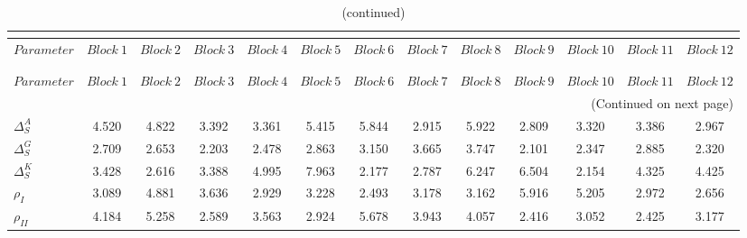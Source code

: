  
\begin{center}
\begin{longtable}{lcccccccccccc} 
\caption{MCMC Inefficiency factors per block}\\
 \label{Table:MCMC_inefficiency_factors}\\
\toprule 
$Parameter           $	 & 	 $     Block~1$	 & 	 $     Block~2$	 & 	 $     Block~3$	 & 	 $     Block~4$	 & 	 $     Block~5$	 & 	 $     Block~6$	 & 	 $     Block~7$	 & 	 $     Block~8$	 & 	 $     Block~9$	 & 	 $    Block~10$	 & 	 $    Block~11$	 & 	 $    Block~12$\\
\midrule \endfirsthead 
\caption{(continued)}\\
 \toprule \\ 
$Parameter           $	 & 	 $     Block~1$	 & 	 $     Block~2$	 & 	 $     Block~3$	 & 	 $     Block~4$	 & 	 $     Block~5$	 & 	 $     Block~6$	 & 	 $     Block~7$	 & 	 $     Block~8$	 & 	 $     Block~9$	 & 	 $    Block~10$	 & 	 $    Block~11$	 & 	 $    Block~12$\\
\midrule \endhead 
\midrule \multicolumn{13}{r}{(Continued on next page)} \\ \bottomrule \endfoot 
\bottomrule \endlastfoot 
$ {\Delta^{A}_{S}}   $	 & 	       4.520	 & 	       4.822	 & 	       3.392	 & 	       3.361	 & 	       5.415	 & 	       5.844	 & 	       2.915	 & 	       5.922	 & 	       2.809	 & 	       3.320	 & 	       3.386	 & 	       2.967 \\ 
$ {\Delta^{G}_{S}}   $	 & 	       2.709	 & 	       2.653	 & 	       2.203	 & 	       2.478	 & 	       2.863	 & 	       3.150	 & 	       3.665	 & 	       3.747	 & 	       2.101	 & 	       2.347	 & 	       2.885	 & 	       2.320 \\ 
$ {\Delta^{K}_{S}}   $	 & 	       3.428	 & 	       2.616	 & 	       3.388	 & 	       4.995	 & 	       7.963	 & 	       2.177	 & 	       2.787	 & 	       6.247	 & 	       6.504	 & 	       2.154	 & 	       4.325	 & 	       4.425 \\ 
$ {\rho_{I}}         $	 & 	       3.089	 & 	       4.881	 & 	       3.636	 & 	       2.929	 & 	       3.228	 & 	       2.493	 & 	       3.178	 & 	       3.162	 & 	       5.916	 & 	       5.205	 & 	       2.972	 & 	       2.656 \\ 
$ {\rho_{II}}        $	 & 	       4.184	 & 	       5.258	 & 	       2.589	 & 	       3.563	 & 	       2.924	 & 	       5.678	 & 	       3.943	 & 	       4.057	 & 	       2.416	 & 	       3.052	 & 	       2.425	 & 	       3.177 \\ 

\end{longtable}
\end{center}

